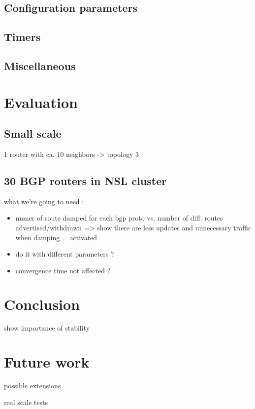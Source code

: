 \documentclass[a4paper,english]{IEEEtran}
\begin{document}
\subsection{Configuration parameters}


\subsection{Timers}


\subsection{Miscellaneous}


\section{Evaluation}


\subsection{Small scale}

1 router with ca. 10 neighbors -> topology 3


\subsection{30 BGP routers in NSL cluster}

what we're going to need :
\begin{itemize}
\item numer of route damped for each bgp proto vs. number of diff. routes
advertised/withdrawn => show there are less updates and unnecessary
traffic when damping = activated
\item do it with different parameters ?
\item convergence time not affected ?
\end{itemize}

\section{Conclusion}

show importance of stability


\section{Future work}

possible extensions

real scale tests
\end{document}
